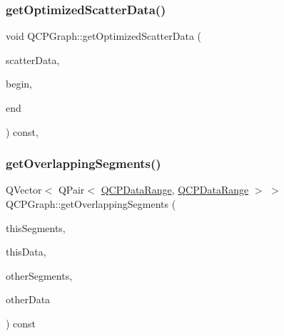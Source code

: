 \subsubsection{\texorpdfstring{getOptimizedScatterData()}{getOptimizedScatterData()}}
{\footnotesize\ttfamily void Q\+C\+P\+Graph\+::get\+Optimized\+Scatter\+Data (\begin{DoxyParamCaption}\item[{Q\+Vector$<$ \mbox{\hyperlink{class_q_c_p_graph_data}{Q\+C\+P\+Graph\+Data}} $>$ $\ast$}]{scatter\+Data,  }\item[{\mbox{\hyperlink{class_q_c_p_data_container_ae40a91f5cb0bcac61d727427449b7d15}{Q\+C\+P\+Graph\+Data\+Container\+::const\+\_\+iterator}}}]{begin,  }\item[{\mbox{\hyperlink{class_q_c_p_data_container_ae40a91f5cb0bcac61d727427449b7d15}{Q\+C\+P\+Graph\+Data\+Container\+::const\+\_\+iterator}}}]{end }\end{DoxyParamCaption}) const\hspace{0.3cm}{\ttfamily [protected]}, {\ttfamily [virtual]}}

\mbox{\label{class_q_c_p_graph_a334b15c43ee1855bf724daf886e8530e}} 
\subsubsection{\texorpdfstring{getOverlappingSegments()}{getOverlappingSegments()}}
{\footnotesize\ttfamily Q\+Vector$<$ Q\+Pair$<$ \mbox{\hyperlink{class_q_c_p_data_range}{Q\+C\+P\+Data\+Range}}, \mbox{\hyperlink{class_q_c_p_data_range}{Q\+C\+P\+Data\+Range}} $>$ $>$ Q\+C\+P\+Graph\+::get\+Overlapping\+Segments (\begin{DoxyParamCaption}\item[{Q\+Vector$<$ \mbox{\hyperlink{class_q_c_p_data_range}{Q\+C\+P\+Data\+Range}} $>$}]{this\+Segments,  }\item[{const Q\+Vector$<$ Q\+PointF $>$ $\ast$}]{this\+Data,  }\item[{Q\+Vector$<$ \mbox{\hyperlink{class_q_c_p_data_range}{Q\+C\+P\+Data\+Range}} $>$}]{other\+Segments,  }\item[{const Q\+Vector$<$ Q\+PointF $>$ $\ast$}]{other\+Data }\end{DoxyParamCaption}) const\hspace{0.3cm}{\ttfamily [protected]}}

